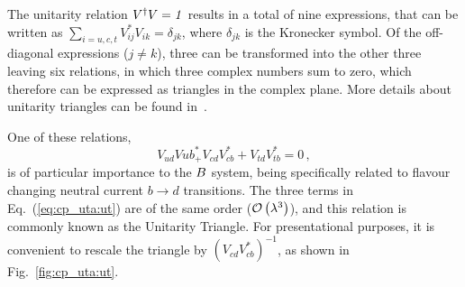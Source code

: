 

The unitarity relation ${V}^\dagger{V} = {\mathit 1}$
results in a total of nine expressions,
that can be written as
$\sum_{i=u,c,t} V_{ij}^*V_{ik} = \delta_{jk}$,
where $\delta_{jk}$ is the Kronecker symbol.
Of the off-diagonal expressions ($j \neq k$),
three can be transformed into the other three 
leaving six relations, in which three complex numbers sum to zero,
which therefore can be expressed as triangles in the complex plane.
More details about unitarity triangles can be found in~\cite{Jarlskog:1985ht,Jarlskog:2005uq,Bjorken:2005rm,Harrison:2009bz,Frampton:2010ii,Frampton:2010uq}.

One of these relations,
\begin{equation}
  \label{eq:cp_uta:ut}
  V_{ud}V{ub}^*_ + V_{cd}V_{cb}^* + V_{td}V_{tb}^* = 0\,,
\end{equation}
is of particular importance to the $B$ system, 
being specifically related to flavour changing 
neutral current $b \to d$ transitions.
The three terms in Eq.~(\ref{eq:cp_uta:ut}) are of the same order 
(${\cal O}\left( \lambda^3 \right)$),
and this relation is commonly known as the Unitarity Triangle.
For presentational purposes,
it is convenient to rescale the triangle by $(V_{cd}V_{cb}^*)^{-1}$,
as shown in Fig.~\ref{fig:cp_uta:ut}.

